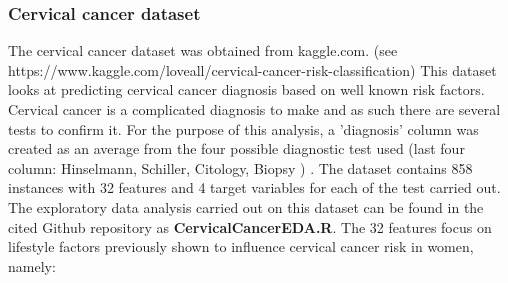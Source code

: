 \subsubsection{Cervical cancer dataset}
The cervical cancer dataset was obtained from kaggle.com. \newline
(see https://www.kaggle.com/loveall/cervical-cancer-risk-classification)\newline
This dataset looks at predicting cervical cancer diagnosis based on well known risk factors. Cervical cancer is a complicated diagnosis to make and as such there are several tests to confirm it. For the purpose of this analysis, a 'diagnosis' column was created as an average from the four possible diagnostic test used  (last four column: Hinselmann, Schiller, Citology, Biopsy ) \citep{Fernandes:2017td, Wu:2017fa}.\newline
The dataset contains 858 instances with 32 features and 4 target variables for each of the test carried out.\newline
The exploratory data analysis carried out on this dataset can be found in the cited Github repository as \textbf{CervicalCancerEDA.R}.\newline
The 32 features focus on lifestyle factors previously shown to influence cervical cancer risk in women, namely:
